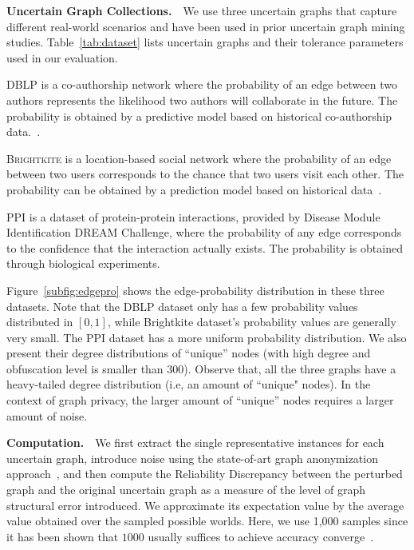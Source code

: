 \textbf{Uncertain Graph Collections.}~~We use three uncertain graphs that capture different real-world scenarios and have been used in prior uncertain graph mining studies. Table~\ref{tab:dataset} lists uncertain graphs and their tolerance parameters used in our evaluation.

\textsc{DBLP} is a co-authorship network where the probability of an edge between two authors represents the likelihood two authors will collaborate in the future. The probability is obtained by a predictive model based on historical co-authorship data.~\cite{Jin_Distance_2011}. 

\textsc{Brightkite} is a location-based social network where the probability of an edge between two users corresponds to the chance that two users visit each other. The probability can be obtained by a prediction model based on historical data~\cite{Cho_Friendship_2011}.

\textsc{PPI} is a dataset of protein-protein interactions, provided by Disease Module Identification DREAM Challenge, where the probability of any edge corresponds to the confidence that the interaction actually exists.
The probability is obtained through biological experiments.

Figure~\ref{subfig:edgepro} shows the edge-probability distribution in these three datasets. 
Note that the DBLP dataset only has a few probability values distributed in $[0,1]$, while Brightkite dataset's probability values are generally very small. The PPI dataset has a more uniform probability distribution. 
We also present their degree distributions of ``unique'' nodes (with high degree and obfuscation level is smaller than $300$). Observe that, all the three graphs have a heavy-tailed degree distribution (i.e, an amount of ``unique" nodes). In the context of graph privacy, the larger amount of ``unique'' nodes requires a larger amount of noise.


\textbf{Computation.}~~We first extract the single representative instances for each uncertain graph, introduce noise using the state-of-art graph anonymization approach~\cite{Boldi_Injecting_2012}, and then compute the Reliability Discrepancy between the perturbed graph and the original uncertain graph as a measure of the level of graph structural error introduced. We approximate its expectation value by the average value obtained over the sampled possible worlds. Here, we use 1,000 samples since it has been shown that $1000$ usually suffices to achieve accuracy converge~\cite{Potamias_K_2010}.

